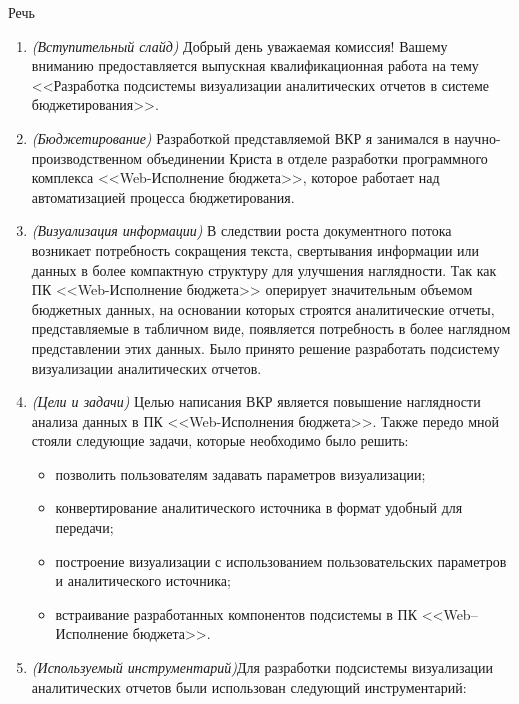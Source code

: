 \documentclass[a4paper, 12pt]{report}
\begin{document}
\begin{center}
	\Large Речь
\end{center}\par
\begin{enumerate}[label=\textbf{\arabic*})]
	\item \textit{(Вступительный слайд)} Добрый день уважаемая комиссия! Вашему вниманию пре\-доставляется выпускная квалификационная работа на тему <<Разработка подсистемы визуализации аналитических отчетов в системе бюджетирования>>.
	\item \textit{(Бюджетирование)} Разработкой представляемой ВКР я занимался в научно-произ\-водственном объединении Криста в отделе разработки программного комплекса <<Web-Исполнение бюджета>>, которое работает над автоматизацией процесса бюджетирования. %
	\item \textit{(Визуализация информации)} В следствии роста документного потока возникает потребность сокращения текста, свертывания информации или данных в более компактную структуру для улучшения наглядности. Так как ПК <<Web-Исполнение бюджета>> оперирует значительным объемом бюджетных данных, на основании которых строятся аналитические отчеты, представляемые в табличном виде, появляется потребность в более наглядном представлении этих данных. Было принято решение разработать подсистему визуализации аналитических отчетов.
	\item \textit{(Цели и задачи)} Целью написания ВКР является повышение наглядности анализа данных в ПК <<Web-Исполнения бюджета>>. Также передо мной стояли следующие задачи, которые необходимо было решить:
		\begin{itemize}
			\item позволить пользователям задавать параметров визуализации;
			\item конвертирование аналитического источника в формат удобный для передачи;
			\item построение визуализации с использованием пользовательских параметров и \-аналитического источника;
			\item встраивание разработанных компонентов подсистемы в ПК <<Web–Исполнение бюджета>>.
		\end{itemize}
	\item \textit{(Используемый инструментарий)}Для разработки подсистемы визуализации аналитических отчетов были использован следующий инструментарий:

\end{enumerate}
\end{document}
